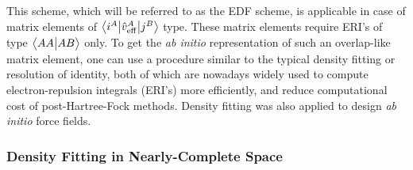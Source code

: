 This scheme, which will be referred to as the EDF scheme, 
is applicable in case of matrix elements of 
$
 \bigl\langle {i^A} \bigl\lvert {\hat{v}_{\rm eff}^A} \bigl\lvert {j^B} \bigr\rangle
$ type. 
 These matrix elements require ERI's of type
$\bigl\langle {AA} \bigl\lvert {AB} \bigr\rangle$ only.
To get the \emph{ab initio} representation of such an overlap\hyp{}like matrix element,
one can use a procedure similar to
the typical density fitting or resolution of identity, both of which are nowadays widely used 
to compute electron\hyp{}repulsion integrals (ERI's) more efficiently,
and reduce computational cost of post\hyp{}Hartree\hyp{}Fock methods. Density fitting was also
applied to design \emph{ab initio} force fields.\cite{Piquemal.Cisneros.Reinhardt.Gresh.Darden.JCP.2006,Cisneros.Andres.Piquemal.Darden.JCP.2005}

\subsubsection{\label{sss:2.3.1.GDF-1}Density Fitting in Nearly-Complete Space}

